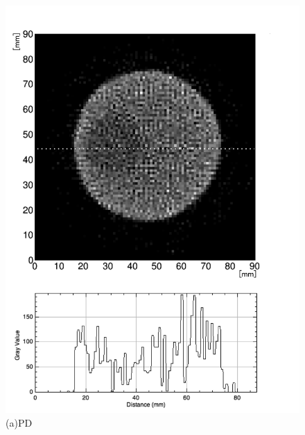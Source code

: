 \begin{figure}[H]
 \begin{minipage}{0.52\hsize}
  \begin{center}
   \includegraphics[bb=0.000000 0.000000 564.433340 778.975605,width=1.01\hsize]{image2/chapter5/low_contrast_PD_slice.png}
  \end{center}
  \vspace{-0.7cm}
  \caption*{(a)PD}
 \end{minipage}
 \begin{minipage}{0.52\hsize}
  \begin{center}

\end{center}
\end{minipage}
\end{figure}
